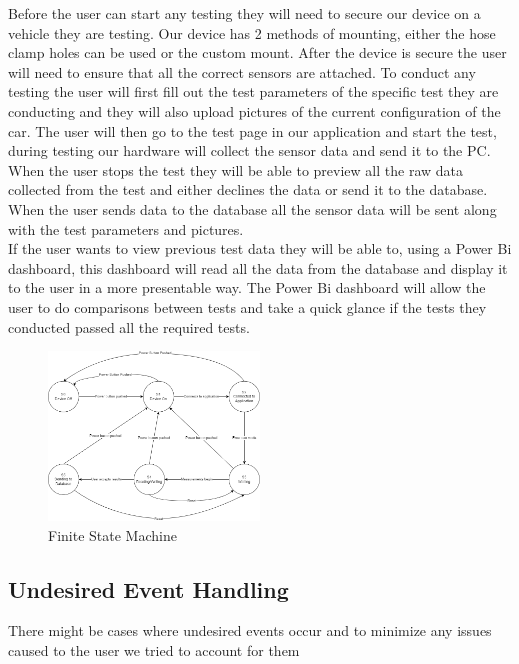 \documentclass[12pt, titlepage]{article}
\begin{document}
Before the user can start any testing they will need to secure our device on a vehicle they are testing. Our device has 2 methods of mounting, either the hose clamp holes can be used or the custom mount. After the device is secure the user will need to ensure that all the correct sensors are attached. To conduct any testing the user will first fill out the test parameters of the specific test they are conducting and they will also upload pictures of the current configuration of the car. The user will then go to the test page in our application and start the test, during testing our hardware will collect the sensor data and send it to the PC. When the user stops the test they will be able to preview all the raw data collected from the test and either declines the data or send it to the database. When the user sends data to the database all the sensor data will be sent along with the test parameters and pictures.\\

If the user wants to view previous test data they will be able to, using a Power Bi dashboard, this dashboard will read all the data from the database and display it to the user in a more presentable way. The Power Bi dashboard will allow the user to do comparisons between tests and take a quick glance if the tests they conducted passed all the required tests.

\begin{figure}[h!]
  \begin{center}
  \includegraphics[width=0.5\textwidth]{state_machine_diagram.png}
  \caption{Finite State Machine}
  \end{center}
  \end{figure}
  \newpage

\subsection{Undesired Event Handling}
There might be cases where undesired events occur and to minimize any issues caused to the user we tried to account for them
\end{document}
